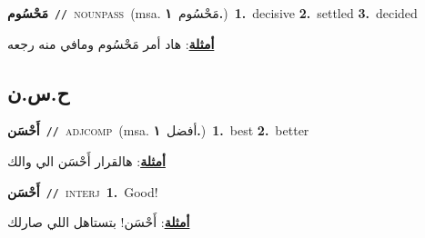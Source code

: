 \documentclass[10pt,a4paper,twoside]{article} %
\begin{document}
\begin{multicols}{2}
{\setlength\topsep{0pt}\textbf{\foreignlanguage{arabic}{مَحْسُوم}}\ {\color{gray}\texttt{//}\color{black}}\ \textsc{noun\textunderscore pass}\ \color{gray}(msa. \foreignlanguage{arabic}{مَحْسُوم}~\foreignlanguage{arabic}{\textbf{١.}})\color{black}\ \textbf{1.}~decisive  \textbf{2.}~settled  \textbf{3.}~decided\  \begin{flushright}\color{gray}\foreignlanguage{arabic}{\textbf{\underline{\foreignlanguage{arabic}{أمثلة}}}: هاد أمر مَحْسُوم ومافي منه رجعه}\end{flushright}\color{black}} \vspace{2mm}

\vspace{-3mm}
\subsection*{\color{blue}\foreignlanguage{arabic}{ح.س.ن}\color{blue}{}} 

{\setlength\topsep{0pt}\textbf{\foreignlanguage{arabic}{أَحْسَن}}\ {\color{gray}\texttt{//}\color{black}}\ \textsc{adj\textunderscore comp}\ \color{gray}(msa. \foreignlanguage{arabic}{أفضل}~\foreignlanguage{arabic}{\textbf{١.}})\color{black}\ \textbf{1.}~best  \textbf{2.}~better\  \begin{flushright}\color{gray}\foreignlanguage{arabic}{\textbf{\underline{\foreignlanguage{arabic}{أمثلة}}}: هالقرار أَحْسَن الي والك}\end{flushright}\color{black}} \vspace{2mm}

{\setlength\topsep{0pt}\textbf{\foreignlanguage{arabic}{أَحْسَن}}\ {\color{gray}\texttt{//}\color{black}}\ \textsc{interj}\ \textbf{1.}~Good!\  \begin{flushright}\color{gray}\foreignlanguage{arabic}{\textbf{\underline{\foreignlanguage{arabic}{أمثلة}}}: أَحْسَن! بتستاهل اللي صارلك}\end{flushright}\color{black}} \vspace{2mm}


\end{multicols}
\end{document}
